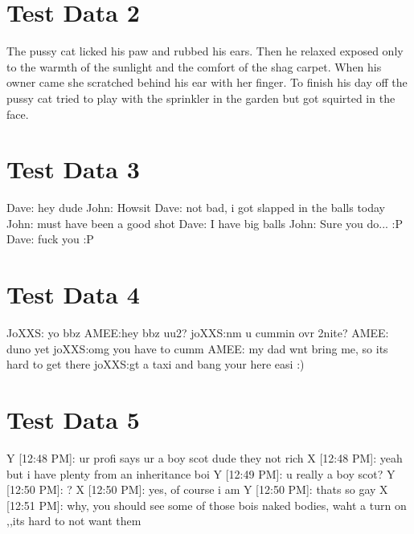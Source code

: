 \documentclass{article}
\begin{document}
\section*{Test Data 2}
The pussy cat licked his paw and rubbed his ears. Then he relaxed exposed only to the warmth of the sunlight and the comfort of the shag carpet.
When his owner came she scratched behind his ear with her finger. 
To finish his day off the pussy cat tried to play with the sprinkler in the garden but got squirted in the face.
\section*{Test Data 3}
Dave: hey dude
\newline
John: Howsit
\newline
Dave: not bad, i got slapped in the balls today
\newline
John: must have been a good shot
\newline
Dave: I have big balls 
\newline
John: Sure you do... :P
\newline
Dave: fuck you :P
\section*{Test Data 4}
JoXXS: yo bbz
\newline
AMEE:hey bbz uu2?
\newline
joXXS:nm u cummin ovr 2nite?
\newline
AMEE: duno yet
\newline
joXXS:omg you have to cumm
\newline
AMEE: my dad wnt bring me, so its hard to get there
\newline
joXXS:gt a taxi and bang your here easi :)
\section*{Test Data 5}
Y [12:48 PM]: ur profi says ur a boy scot dude they not rich 
\newline
X [12:48 PM]: yeah but i have plenty from an inheritance boi 
\newline
Y [12:49 PM]: u really a boy scot? 
\newline
Y [12:50 PM]: ? 
\newline
X [12:50 PM]: yes, of course i am 
\newline
Y [12:50 PM]: thats so gay 
\newline
X [12:51 PM]: why, you should see some of those bois naked bodies, waht a turn on ,,its hard to not want them 
\\
\\
\\
\end{document}
